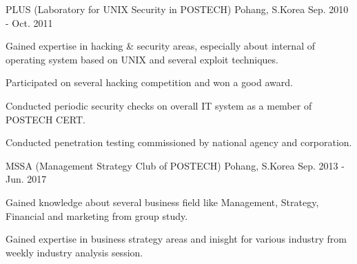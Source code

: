 \begin{cventries}
	{PLUS (Laboratory for UNIX Security in POSTECH)} %
	{Pohang, S.Korea} %
	{Sep. 2010 - Oct. 2011} %
	{
		\begin{cvitems} %
			\item {Gained expertise in hacking \& security areas, especially about internal of operating system based on UNIX and several exploit techniques.}
			\item {Participated on several hacking competition and won a good award.}
			\item {Conducted periodic security checks on overall IT system as a member of POSTECH CERT.}
			\item {Conducted penetration testing commissioned by national agency and corporation.}
		\end{cvitems}
	}

	{MSSA (Management Strategy Club of POSTECH)} %
	{Pohang, S.Korea} %
	{Sep. 2013 - Jun. 2017} %
	{
		\begin{cvitems} %
			\item {Gained knowledge about several business field like Management, Strategy, Financial and marketing from group study.}
			\item {Gained expertise in business strategy areas and inisght for various industry from weekly industry analysis session.}
		\end{cvitems}
	}

\end{cventries}
